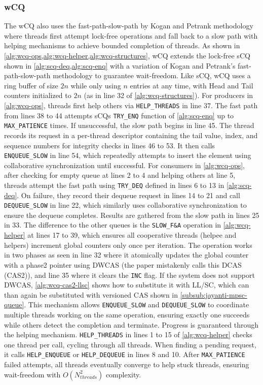 \subsubsection{\acf{wCQ}}\label{subsubsec:wcq}
The \ac{wCQ} also uses the fast-path-slow-path by Kogan and Petrank methodology where threads first attempt lock-free operations and fall back to a slow path with helping mechanisms to achieve bounded completion of threads. As shown in \cref{alg:wcq-ops,alg:wcq-helper,alg:wcq-structures}, \ac{wCQ} extends the lock-free \ac{sCQ} shown in \cref{alg:scq-deq,alg:scq-enq} with a variation of Kogan and Petrank's fast-path-slow-path methodology to guarantee wait-freedom. Like \ac{sCQ}, \ac{wCQ} uses a ring buffer of size $2n$ while only using $n$ entries at any time, with Head and Tail counters initialized to $2n$ (as in line 32 of \cref{alg:wcq-structures}). For producers in \cref{alg:wcq-ops}, threads first help others via \texttt{HELP\_THREADS} in line 37. The fast path from lines 38 to 44 attempts \acsp{sCQ} \texttt{TRY\_ENQ} function of \cref{alg:scq-enq} up to \texttt{MAX\_PATIENCE} times. If unsuccessful, the slow path begins in line 45. The thread records its request in a per-thread descriptor containing the tail value, index, and sequence numbers for integrity checks in lines 46 to 53. It then calls \texttt{ENQUEUE\_SLOW} in line 54, which repeatedly attempts to insert the element using collaborative synchronization until successful. For consumers in \cref{alg:wcq-ops}, after checking for empty queue at lines 2 to 4 and helping others at line 5, threads attempt the fast path using \texttt{TRY\_DEQ} defined in lines 6 to 13 in \cref{alg:scq-deq}. On failure, they record their dequeue request in lines 14 to 21 and call \texttt{DEQUEUE\_SLOW} in line 22, which similarly uses collaborative synchronization to ensure the dequeue completes. Results are gathered from the slow path in lines 25 in 33. The difference to the other queues is the \texttt{SLOW\_F\&A} operation in \cref{alg:wcq-helper} at lines 17 to 39, which ensures all cooperative threads (helpee and helpers) increment global counters only once per iteration. The operation works in two phases as seen in line 32 where it atomically updates the global counter with a phase2 pointer using \ac{DWCAS} (the paper mistakenly calls this \ac{DCAS} (CAS2)), and line 35 where it clears the \texttt{INC} flag. If the system does not support \ac{DWCAS}, \cref{alg:wcq-cas2-llsc} shows how to substitute it with \ac{LL/SC}, which can than again be substituted with versioned \ac{CAS} shown in \cref{subsub:jayanti-mpsc-queue}. This mechanism allows \texttt{ENQUEUE\_SLOW} and \texttt{DEQUEUE\_SLOW} to coordinate multiple threads working on the same operation, ensuring exactly one succeeds while others detect the completion and terminate. Progress is guaranteed through the helping mechanism. \texttt{HELP\_THREADS} in lines 1 to 15 of \cref{alg:wcq-helper} checks one thread per call, cycling through all threads. When finding a pending request, it calls \texttt{HELP\_ENQUEUE} or \texttt{HELP\_DEQUEUE} in lines 8 and 10. After \texttt{MAX\_PATIENCE} failed attempts, all threads eventually converge to help stuck threads, ensuring wait-freedom with $O(N_{threads}^2)$ complexity. \cite{wCQWaitFreeQueue}

